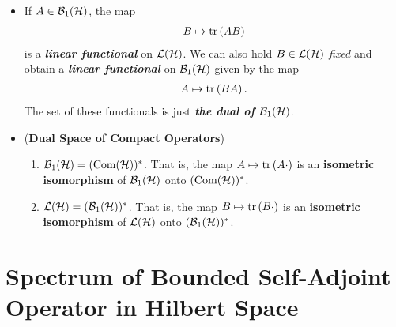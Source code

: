 \documentclass[11pt]{article}
\begin{document}
\begin{itemize}
\item \begin{remark}
If $A \in {\mathcal B}_1({\mathcal H})$, the map
\begin{align*}
B \mapsto \mathrm{tr}\left(AB \right)
\end{align*} is a \emph{\textbf{linear functional}} on ${\mathcal L}({\mathcal H})$. We can also hold $B \in {\mathcal L}({\mathcal H})$ \emph{fixed} and obtain a \emph{\textbf{linear functional}} on ${\mathcal B}_1({\mathcal H})$ given by the map 
\begin{align*}
A \mapsto \mathrm{tr}\left(BA \right).
\end{align*}
The set of these functionals is just \emph{\textbf{the dual of ${\mathcal B}_1({\mathcal H})$}}.
\end{remark}

\item \begin{proposition} (\textbf{Dual Space of Compact Operators}) \citep{reed1980methods}
\begin{enumerate}
\item ${\mathcal B}_1({\mathcal H}) = (\text{Com}({\mathcal H}))^{*}$.  That is, the map $A \mapsto \mathrm{tr}\left(A \cdot \right)$ is an \textbf{isometric isomorphism} of ${\mathcal B}_1({\mathcal H})$ onto $(\text{Com}({\mathcal H}))^{*}$. 
\item ${\mathcal L}({\mathcal H})= ({\mathcal B}_1({\mathcal H}))^{*}$.  That is, the map $B \mapsto \mathrm{tr}\left(B\cdot \right)$ is an \textbf{isometric isomorphism} of ${\mathcal L}({\mathcal H})$ onto $({\mathcal B}_1({\mathcal H}))^{*}$. 
\end{enumerate}
\end{proposition}
\end{itemize}

\section{Spectrum of Bounded Self-Adjoint Operator in Hilbert Space}
\end{document}
